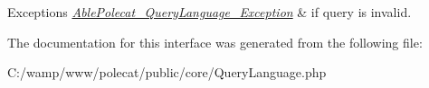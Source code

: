 \begin{DoxyExceptions}{Exceptions}
{\em \hyperlink{class_able_polecat___query_language___exception}{Able\+Polecat\+\_\+\+Query\+Language\+\_\+\+Exception}} & if query is invalid. \\
\hline
\end{DoxyExceptions}


The documentation for this interface was generated from the following file\+:\begin{DoxyCompactItemize}
\item 
C\+:/wamp/www/polecat/public/core/Query\+Language.\+php\end{DoxyCompactItemize}
